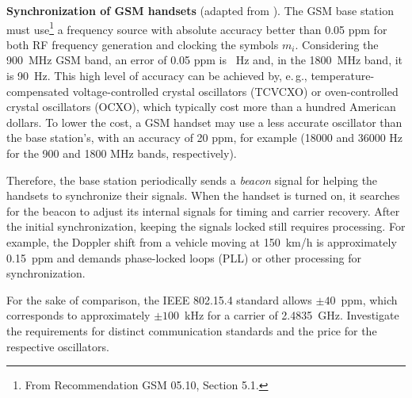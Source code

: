\bApplication \textbf{Synchronization of GSM handsets} (adapted from ).
\label{app:gsmSync}
The GSM base station must use\footnote{From Recommendation GSM 05.10, Section 5.1.} a frequency source 
with absolute accuracy better than 0.05 ppm for both RF frequency generation and clocking the symbols $m_i$. Considering the 900~MHz GSM band, an error of 0.05 ppm is ~Hz and, in the 1800~MHz band, it is 90~Hz. This high level of accuracy can be achieved by, e.\,g., temperature-compensated voltage-controlled crystal oscillators (TCVCXO) or oven-controlled crystal oscillators (OCXO), which typically cost more than a hundred American dollars. To lower the cost, a GSM handset may use a less accurate oscillator than the base station's, with an accuracy of 20 ppm, for example (18000 and 36000 Hz for the 900 and 1800 MHz bands, respectively).

Therefore, the base station periodically sends a \emph{beacon} signal for helping the handsets to synchronize their signals. When the handset is turned on, it searches for the beacon to adjust its internal signals for timing and carrier recovery.
After the initial synchronization, keeping the signals locked still requires processing. For example, the Doppler shift from a vehicle moving at 150~km/h is approximately 0.15~ppm and demands phase-locked loops (PLL) or other processing for synchronization.

For the sake of comparison, the IEEE 802.15.4 standard allows $\pm 40$~ppm, which corresponds to approximately $\pm 100$~kHz for a carrier of 2.4835~GHz. Investigate the requirements for distinct communication standards and the price for the respective oscillators.
\eApplication




